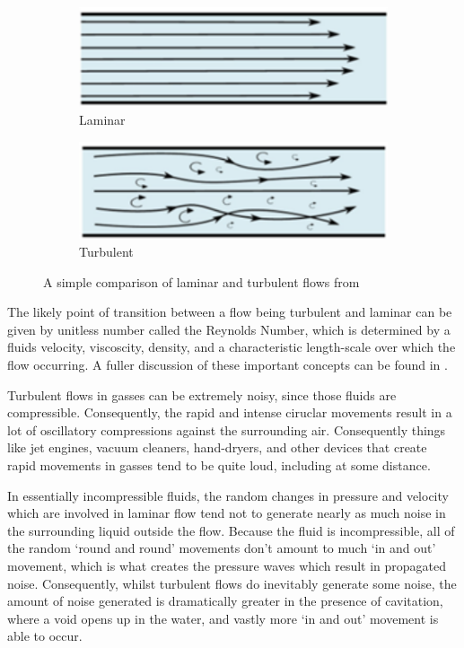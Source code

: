 \documentclass{article}\usepackage[]{graphicx}\usepackage[]{color}
\begin{document}
\begin{appendices}
\begin{figure}[h]


\begin{subfigure}{0.5\textwidth}
\includegraphics[width=0.7\linewidth, center]{Laminar.png}
\caption{Laminar}
\end{subfigure}
\begin{subfigure}{0.5\textwidth}
\includegraphics[width=0.7\linewidth, center]{Turbulent.png}
\caption{Turbulent}
\end{subfigure}

\caption{A simple comparison of laminar and turbulent flows from \parencite{NPdotnet2017}}
\label{fig:LaminarTurbulent.png}
\end{figure}

The likely point of transition between a flow being turbulent and laminar can be given by unitless number called the Reynolds Number, which is determined by a fluids velocity, viscoscity, density, and a characteristic length-scale over which the flow occurring.  A fuller discussion of these important concepts can be found in \cite{NPdotnet2017}.

Turbulent flows in gasses can be extremely noisy, since those fluids are compressible.  Consequently, the rapid and intense ciruclar movements result in a lot of oscillatory compressions against the surrounding air.  Consequently things like jet engines, vacuum cleaners, hand-dryers, and other devices that create rapid movements in gasses tend to be quite loud, including at some distance.

In essentially incompressible fluids, the random changes in pressure and velocity which are involved in laminar flow tend not to generate nearly as much noise in the surrounding liquid outside the flow.  Because the fluid is incompressible, all of the random `round and round' movements don't amount to much `in and out' movement, which is what creates the pressure waves which result in propagated noise. Consequently, whilst turbulent flows do inevitably generate some noise, the amount of noise generated is dramatically greater in the presence of cavitation, where a void opens up in the water, and vastly more `in and out' movement is able to occur.


\end{appendices}
\end{document}
